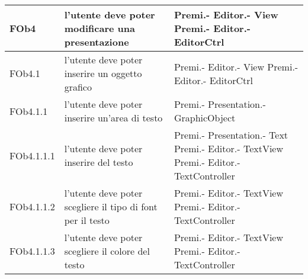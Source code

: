 \begin{longtable}{|l|p{5cm}|p{7cm}|}
\hline
FOb4 & l'utente deve poter modificare una presentazione & Premi.- \linebreak Editor.- \linebreak View \linebreak Premi.- \linebreak Editor.- \linebreak EditorCtrl \linebreak \\
\hline
FOb4.1 & l'utente deve poter inserire un oggetto grafico & Premi.- \linebreak Editor.- \linebreak View \linebreak Premi.- \linebreak Editor.- \linebreak EditorCtrl \linebreak \\
\hline
FOb4.1.1 & l'utente deve poter inserire un'area di testo & Premi.- \linebreak Presentation.- \linebreak GraphicObject \linebreak \\
\hline
FOb4.1.1.1 & l'utente deve poter inserire del testo & Premi.- \linebreak Presentation.- \linebreak Text \linebreak Premi.- \linebreak Editor.- \linebreak TextView \linebreak Premi.- \linebreak Editor.- \linebreak TextController \linebreak \\
\hline
FOb4.1.1.2 & l'utente deve poter scegliere il tipo di font per il testo & Premi.- \linebreak Editor.- \linebreak TextView \linebreak Premi.- \linebreak Editor.- \linebreak TextController \linebreak \\
\hline
FOb4.1.1.3 & l'utente deve poter scegliere il colore del testo & Premi.- \linebreak Editor.- \linebreak TextView \linebreak Premi.- \linebreak Editor.- \linebreak TextController \linebreak \\

\end{longtable}
